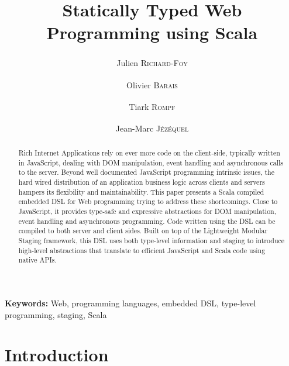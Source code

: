 \documentclass[american,english,runningheads]{llncs}
\newcommand{\etal}{\emph{et al.~}}
\newcommand{\noun}[1]{\textsc{#1}}
\begin{document}
\setcounter{lstlisting}{0}
\renewcommand{\thelstlisting}{\arabic{lstlisting}}

\title{Statically Typed Web Programming using Scala}

\author{Julien \noun{Richard-Foy}\textsuperscript{\textasteriskcentered}\textsuperscript{\textdaggerdbl} \and Olivier
\noun{Barais}\textsuperscript{\textasteriskcentered} \and Tiark \noun{Rompf}\textsuperscript{\textdagger} \and
Jean-Marc \noun{Jézéquel}\textsuperscript{\textasteriskcentered}}

\authorrunning{Julien \noun{Richard-Foy} \etal{}}

\maketitle


\begin{abstract}
Rich Internet Applications rely on ever more code on the client-side, typically written in JavaScript, dealing with
DOM manipulation, event handling and asynchronous calls to the server. Beyond well documented JavaScript programming
intrinsic issues, the hard wired distribution of an application business logic across clients and servers hampers its
flexibility and maintainability. This paper presents a Scala compiled embedded DSL for Web programming trying to
address these shortcomings. Close to JavaScript, it provides type-safe and expressive abstractions for DOM
manipulation, event handling and asynchronous programming. Code written using the DSL can be compiled to both server
and client sides. Built on top of the Lightweight Modular Staging framework, this DSL uses both type-level information
and staging to  introduce high-level abstractions that translate to efficient JavaScript and Scala code using native
APIs.
\end{abstract}

{\bf Keywords:} Web, programming languages, embedded DSL, type-level programming, staging, Scala

\section{Introduction}
\end{document}
